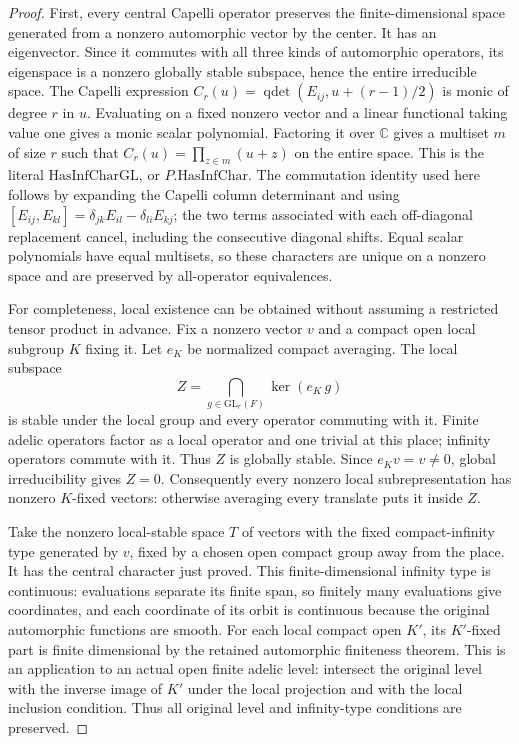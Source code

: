 \begin{proof}
First, every central Capelli operator preserves the finite-dimensional
space generated from a nonzero automorphic vector by the center.
It has an eigenvector.  Since it commutes with all three kinds of
automorphic operators, its eigenspace is a nonzero globally stable
subspace, hence the entire irreducible space.  The Capelli expression
\(C_r(u)=\operatorname{qdet}(E_{ij},u+(r-1)/2)\) is monic of
degree \(r\) in \(u\).  Evaluating on a fixed nonzero vector and
a linear functional taking value one gives a monic scalar polynomial.
Factoring it over \(\mathbb C\) gives a multiset \(m\) of size
\(r\) such that
\(C_r(u)=\prod_{z\in m}(u+z)\) on the entire space.  This is the
literal \(\mathrm{HasInfCharGL}\), or \(P.\mathrm{HasInfChar}\).
The commutation identity used here follows by expanding the Capelli
column determinant and using
\([E_{ij},E_{kl}]=\delta_{jk}E_{il}-\delta_{li}E_{kj}\);
the two terms associated with each off-diagonal replacement cancel,
including the consecutive diagonal shifts.  Equal scalar polynomials
have equal multisets, so these characters are unique on a nonzero
space and are preserved by all-operator equivalences.

For completeness, local existence can be obtained without assuming
a restricted tensor product in advance.  Fix a nonzero vector \(v\)
and a compact open local subgroup \(K\) fixing it.  Let \(e_K\)
be normalized compact averaging.  The local subspace
\[
                  Z=\bigcap_{g\in\mathrm{GL}_r(F)}
                       \ker(e_K\,g)
 \tag{BCS.8}
\]
is stable under the local group and every operator commuting with
it.  Finite adelic operators factor as a local operator and one
trivial at this place; infinity operators commute with it.  Thus
\(Z\) is globally stable.  Since \(e_Kv=v\ne0\), global
irreducibility gives \(Z=0\).  Consequently every nonzero local
subrepresentation has nonzero \(K\)-fixed vectors: otherwise
averaging every translate puts it inside \(Z\).

Take the nonzero local-stable space \(T\) of vectors with the
fixed compact-infinity type generated by \(v\), fixed by a chosen
open compact group away from the place.  It has the central
character just proved.  This finite-dimensional infinity type is
continuous: evaluations separate its finite span, so finitely many
evaluations give coordinates, and each coordinate of its orbit is
continuous because the original automorphic functions are smooth.
For each local compact open \(K'\), its
\(K'\)-fixed part is finite dimensional by the retained automorphic
finiteness theorem.  This is an application to an actual open finite
adelic level: intersect the original level with the inverse image of
\(K'\) under the local projection and with the local inclusion
condition.  Thus all original level and infinity-type conditions are
preserved.


\end{proof}

